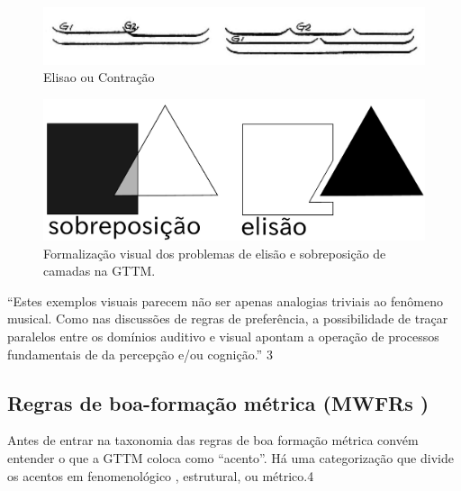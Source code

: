 \documentclass[
	12pt,				%
	openright,			%
	twoside,			%
	a4paper,			%
	english,			%
	french,				%
	spanish,			%
	brazil				%
	]{abntex2}
\begin{document}
\begin{figure}[htb]
	\caption{\label{fig_grafico}Elisao ou Contração}
	\begin{center}
	    \includegraphics[scale=0.5]{gttm/GWFRfig32.png}
	\end{center}
\end{figure}

\begin{figure}[htb]
	\caption{\label{fig_grafico}Formalização visual dos problemas de elisão e sobreposição de camadas na GTTM. \cite[ p.69]{lerdahl1983generative}}
	\begin{center}
	    \includegraphics[scale=0.25]{gestalt/gestalt_elision_overlay.pdf}
	\end{center}
\end{figure}



“Estes exemplos visuais parecem não ser apenas analogias triviais ao fenômeno musical. Como nas discussões de regras de preferência, a possibilidade de traçar paralelos entre os domínios auditivo e visual apontam a operação de processos fundamentais de da percepção e/ou cognição.” \cite{lerdahl1983generative} 3

\subsection{Regras de boa-formação métrica (MWFRs )}

Antes de entrar na taxonomia das regras de boa formação métrica convém entender o que a GTTM coloca como “acento”. Há uma categorização que divide os acentos em fenomenológico , estrutural, ou métrico.4 
\end{document}
